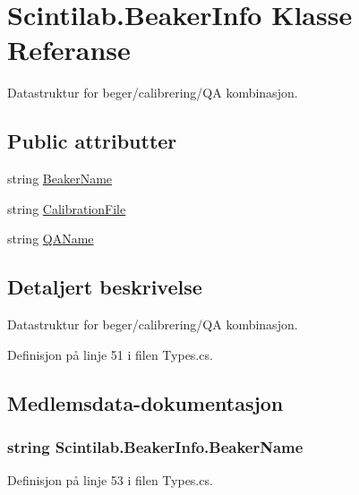 \hypertarget{class_scintilab_1_1_beaker_info}{\section{Scintilab.\+Beaker\+Info Klasse Referanse}
\label{class_scintilab_1_1_beaker_info}
}


Datastruktur for beger/calibrering/\+Q\+A kombinasjon.  


\subsection*{Public attributter}
\begin{DoxyCompactItemize}
\item 
string \hyperlink{class_scintilab_1_1_beaker_info_ad64e0fe748757fb68caf76b4809bef13}{Beaker\+Name}
\item 
string \hyperlink{class_scintilab_1_1_beaker_info_a978205fb02070c6986658d7dd4d906fa}{Calibration\+File}
\item 
string \hyperlink{class_scintilab_1_1_beaker_info_a77fc3aac52eb159c41750b306033e06e}{Q\+A\+Name}
\end{DoxyCompactItemize}


\subsection{Detaljert beskrivelse}
Datastruktur for beger/calibrering/\+Q\+A kombinasjon. 

Definisjon på linje 51 i filen Types.\+cs.



\subsection{Medlemsdata-\/dokumentasjon}
\hypertarget{class_scintilab_1_1_beaker_info_ad64e0fe748757fb68caf76b4809bef13}{
\subsubsection[{Beaker\+Name}]{\setlength{\rightskip}{0pt plus 5cm}string Scintilab.\+Beaker\+Info.\+Beaker\+Name}}\label{class_scintilab_1_1_beaker_info_ad64e0fe748757fb68caf76b4809bef13}


Definisjon på linje 53 i filen Types.\+cs.


